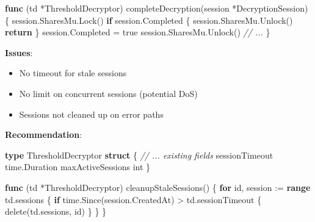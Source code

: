 \documentclass[
]{article}
\newenvironment{Shaded}{}{}
\newcommand{\BuiltInTok}[1]{\textcolor[rgb]{0.00,0.50,0.00}{#1}}
\newcommand{\CommentTok}[1]{\textcolor[rgb]{0.38,0.63,0.69}{\textit{#1}}}
\newcommand{\ControlFlowTok}[1]{\textcolor[rgb]{0.00,0.44,0.13}{\textbf{#1}}}
\newcommand{\DataTypeTok}[1]{\textcolor[rgb]{0.56,0.13,0.00}{#1}}
\newcommand{\KeywordTok}[1]{\textcolor[rgb]{0.00,0.44,0.13}{\textbf{#1}}}
\newcommand{\NormalTok}[1]{#1}
\newcommand{\OperatorTok}[1]{\textcolor[rgb]{0.40,0.40,0.40}{#1}}
\newcommand{\OtherTok}[1]{\textcolor[rgb]{0.00,0.44,0.13}{#1}}
\providecommand{\tightlist}{%
  \setlength{\itemsep}{0pt}\setlength{\parskip}{0pt}}
\begin{document}
\begin{Shaded}
\begin{Highlighting}[]
\KeywordTok{func} \OperatorTok{(}\NormalTok{td }\OperatorTok{*}\NormalTok{ThresholdDecryptor}\OperatorTok{)}\NormalTok{ completeDecryption}\OperatorTok{(}\NormalTok{session }\OperatorTok{*}\NormalTok{DecryptionSession}\OperatorTok{)} \OperatorTok{\{}
\NormalTok{    session}\OperatorTok{.}\NormalTok{SharesMu}\OperatorTok{.}\NormalTok{Lock}\OperatorTok{()}
    \ControlFlowTok{if}\NormalTok{ session}\OperatorTok{.}\NormalTok{Completed }\OperatorTok{\{}
\NormalTok{        session}\OperatorTok{.}\NormalTok{SharesMu}\OperatorTok{.}\NormalTok{Unlock}\OperatorTok{()}
        \ControlFlowTok{return}
    \OperatorTok{\}}
\NormalTok{    session}\OperatorTok{.}\NormalTok{Completed }\OperatorTok{=} \OtherTok{true}
\NormalTok{    session}\OperatorTok{.}\NormalTok{SharesMu}\OperatorTok{.}\NormalTok{Unlock}\OperatorTok{()}
    \CommentTok{// ...}
\OperatorTok{\}}
\end{Highlighting}
\end{Shaded}

\textbf{Issues}:

\begin{itemize}
\tightlist
\item
  No timeout for stale sessions
\item
  No limit on concurrent sessions (potential DoS)
\item
  Sessions not cleaned up on error paths
\end{itemize}

\textbf{Recommendation}:

\begin{Shaded}
\begin{Highlighting}[]
\KeywordTok{type}\NormalTok{ ThresholdDecryptor }\KeywordTok{struct} \OperatorTok{\{}
    \CommentTok{// ... existing fields}
\NormalTok{    sessionTimeout   time}\OperatorTok{.}\NormalTok{Duration}
\NormalTok{    maxActiveSessions }\DataTypeTok{int}
\OperatorTok{\}}

\KeywordTok{func} \OperatorTok{(}\NormalTok{td }\OperatorTok{*}\NormalTok{ThresholdDecryptor}\OperatorTok{)}\NormalTok{ cleanupStaleSessions}\OperatorTok{()} \OperatorTok{\{}
    \ControlFlowTok{for}\NormalTok{ id}\OperatorTok{,}\NormalTok{ session }\OperatorTok{:=} \KeywordTok{range}\NormalTok{ td}\OperatorTok{.}\NormalTok{sessions }\OperatorTok{\{}
        \ControlFlowTok{if}\NormalTok{ time}\OperatorTok{.}\NormalTok{Since}\OperatorTok{(}\NormalTok{session}\OperatorTok{.}\NormalTok{CreatedAt}\OperatorTok{)} \OperatorTok{\textgreater{}}\NormalTok{ td}\OperatorTok{.}\NormalTok{sessionTimeout }\OperatorTok{\{}
            \BuiltInTok{delete}\OperatorTok{(}\NormalTok{td}\OperatorTok{.}\NormalTok{sessions}\OperatorTok{,}\NormalTok{ id}\OperatorTok{)}
        \OperatorTok{\}}
    \OperatorTok{\}}
\OperatorTok{\}}
\end{Highlighting}
\end{Shaded}
\end{document}
